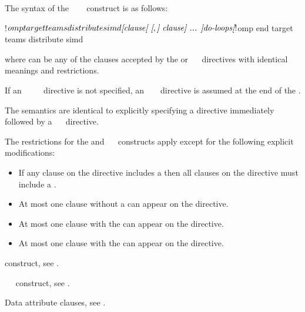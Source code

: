 \begin{fortranspecific}
The syntax of the ~~~ 
construct is as follows:

\begin{ompfPragma}
!$omp target teams distribute simd \plc{[clause[ [},\plc{] clause] ... ]}
    \plc{do-loops}
\plc{[}!$omp end target teams distribute simd\plc{]}
\end{ompfPragma}

where  can be any of the clauses accepted by the  or
~~ directives with identical meanings 
and restrictions.

If an ~~~~ 
directive is not specified, an ~  
~ directive is assumed at the end of the .
\end{fortranspecific}

\descr
The semantics are identical to explicitly specifying a  directive 
immediately followed by a ~~ directive.

\restrictions
The restrictions for the  and ~~ 
constructs apply except for the following explicit modifications:

\begin{itemize}
\item If any  clause on the directive includes a
       then all  clauses
      on the directive must include a .
\item At most one  clause without a
       can appear on the directive.
\item At most one  clause with the 
       can appear on the directive.
\item At most one  clause with the 
       can appear on the directive.
\end{itemize}

\begin{crossrefs}
\item {} construct, see
.

\item {}~~ construct, see
.

\item Data attribute clauses, see
.
\end{crossrefs}




